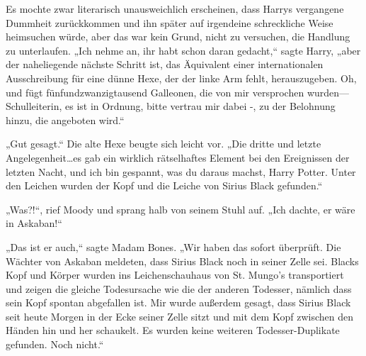 Es mochte zwar literarisch unausweichlich erscheinen, dass Harrys vergangene Dummheit zurückkommen und ihn später auf irgendeine schreckliche Weise heimsuchen würde, aber das war kein Grund, nicht zu versuchen, die Handlung zu unterlaufen.
„Ich nehme an, ihr habt schon daran gedacht,“ sagte Harry, „aber der naheliegende nächste Schritt ist, das Äquivalent einer internationalen Ausschreibung für eine dünne Hexe, der der linke Arm fehlt, herauszugeben. Oh, und fügt fünfundzwanzigtausend Galleonen, die von mir versprochen wurden—Schulleiterin, es ist in Ordnung, bitte vertrau mir dabei -, zu der Belohnung hinzu, die angeboten wird.“

„Gut gesagt.“
Die alte Hexe beugte sich leicht vor.
„Die dritte und letzte Angelegenheit…es gab ein wirklich rätselhaftes Element bei den Ereignissen der letzten Nacht, und ich bin gespannt, was du daraus machst, Harry Potter. Unter den Leichen wurden der Kopf und die Leiche von Sirius Black gefunden.“

„Was?!“, rief Moody und sprang halb von seinem Stuhl auf. „Ich dachte, er wäre in Askaban!“

„Das ist er auch,“ sagte Madam Bones. „Wir haben das sofort überprüft. Die Wächter von Askaban meldeten, dass Sirius Black noch in seiner Zelle sei. Blacks Kopf und Körper wurden ins Leichenschauhaus von St. Mungo's transportiert und zeigen die gleiche Todesursache wie die der anderen Todesser, nämlich dass sein Kopf spontan abgefallen ist. Mir wurde außerdem gesagt, dass Sirius Black seit heute Morgen in der Ecke seiner Zelle sitzt und mit dem Kopf zwischen den Händen hin und her schaukelt. Es wurden keine weiteren Todesser-Duplikate gefunden. Noch nicht.“

